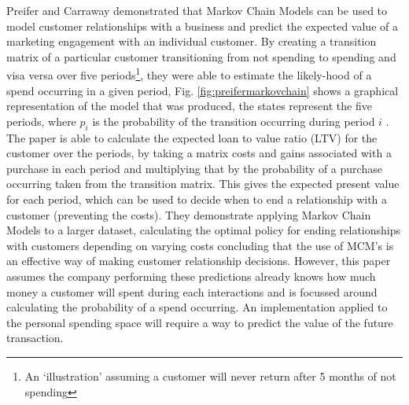 Preifer and Carraway demonstrated that Markov Chain Models can be used to model customer relationships with a business and predict the expected value of a marketing engagement with an individual customer. By creating a transition matrix of a particular customer transitioning from not spending to spending and visa versa over five periods\footnote{An `illustration' assuming a customer will never return after 5 months of not spending}, they were able to estimate the likely-hood of a spend occurring in a given period, Fig. \ref{fig:preifermarkovchain} shows a graphical representation of the model that was produced, the states represent the five periods, where $p_{i}$ is the probability of the transition occurring during period $i$ \cite{pfeifer2000modeling}.
% 
The paper is able to calculate the expected loan to value ratio (LTV) for the customer over the periods, by taking a matrix costs and gains associated with a purchase in each period and multiplying that by the probability of a purchase occurring taken from the transition matrix. This gives the expected present value for each period, which can be used to decide when to end a relationship with a customer (preventing the costs).
%
They demonstrate applying Markov Chain Models to a larger dataset, calculating the optimal policy for ending relationships with customers depending on varying costs concluding that the use of MCM's is an effective way of making customer relationship decisions. However, this paper assumes the company performing these predictions already knows how much money a customer will spent during each interactions and is focussed around calculating the probability of a spend occurring. An implementation applied to the personal spending space will require a way to predict the value of the future transaction.
 

